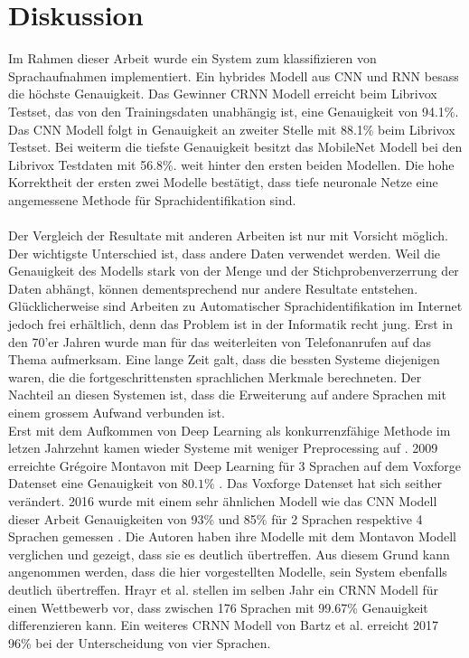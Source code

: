 \section{Diskussion}
Im Rahmen dieser Arbeit wurde ein System zum klassifizieren von Sprachaufnahmen implementiert. Ein hybrides Modell aus CNN und RNN besass die höchste Genauigkeit. Das Gewinner CRNN Modell erreicht beim Librivox Testset, das von den Trainingsdaten unabhängig ist, eine Genauigkeit von 94.1\%. Das CNN Modell folgt in Genauigkeit an zweiter Stelle mit 88.1\% beim Librivox Testset. Bei weiterm die tiefste Genauigkeit besitzt das MobileNet Modell bei den Librivox Testdaten mit 56.8\%. weit hinter den ersten beiden Modellen. Die hohe Korrektheit der ersten zwei Modelle bestätigt, dass tiefe neuronale Netze eine angemessene Methode für Sprachidentifikation sind.
\\ \\
Der Vergleich der Resultate mit anderen Arbeiten ist nur mit Vorsicht möglich. Der wichtigste Unterschied ist, dass andere Daten verwendet werden. Weil die Genauigkeit des Modells stark von der Menge und der Stichprobenverzerrung der Daten abhängt, können dementsprechend nur andere Resultate entstehen. Glücklicherweise sind Arbeiten zu Automatischer Sprachidentifikation im Internet jedoch frei erhältlich, denn das Problem ist in der Informatik recht jung. Erst in den 70'er Jahren wurde man für das weiterleiten von Telefonanrufen auf das Thema aufmerksam. Eine lange Zeit galt, dass die bessten Systeme diejenigen waren, die die fortgeschrittensten sprachlichen Merkmale berechneten. Der Nachteil an diesen Systemen ist, dass die Erweiterung auf andere Sprachen mit einem grossem Aufwand verbunden ist. \parencite{history}
\\
Erst mit dem Aufkommen von Deep Learning als konkurrenzfähige Methode im letzen Jahrzehnt kamen wieder Systeme mit weniger Preprocessing auf \parencite{chollet}. 2009 erreichte Grégoire Montavon mit Deep Learning für 3 Sprachen auf dem Voxforge Datenset eine Genauigkeit von $80.1\%$ \parencite{montavon}. Das Voxforge Datenset hat sich seither verändert. 2016 wurde mit einem sehr ähnlichen Modell wie das CNN Modell dieser Arbeit Genauigkeiten von 93\% und 85\% für 2 Sprachen respektive 4 Sprachen gemessen \parencite{iLID}. Die Autoren haben ihre Modelle mit dem Montavon Modell verglichen und gezeigt, dass sie es deutlich übertreffen. Aus diesem Grund kann angenommen werden, dass die hier vorgestellten Modelle, sein System ebenfalls deutlich übertreffen. Hrayr et al. \parencite{yerevann} stellen im selben Jahr ein CRNN Modell für einen Wettbewerb vor, dass zwischen 176 Sprachen mit 99.67\% Genauigkeit differenzieren kann. Ein weiteres CRNN Modell von Bartz et al. \parencite{crnn} erreicht 2017 96\% bei der Unterscheidung von vier Sprachen.
